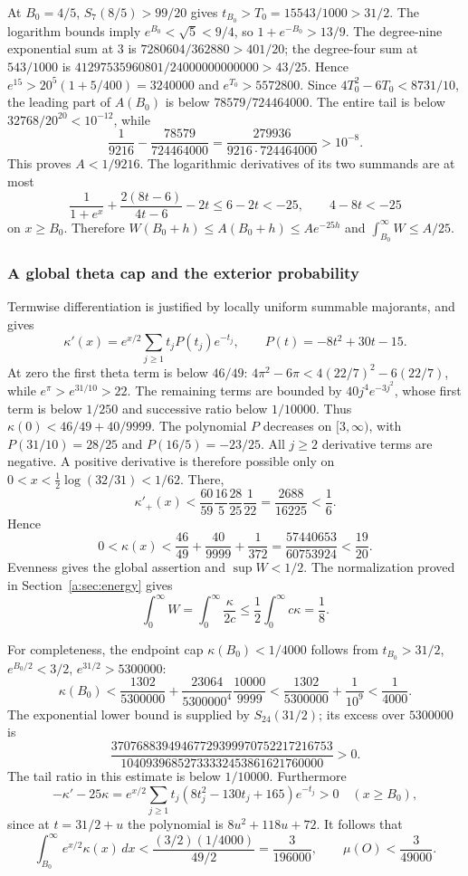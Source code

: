 \documentclass[11pt,a4paper]{article}
\numberwithin{equation}{section}
\theoremstyle{definition}\newtheorem{definition}[theorem]{Definition}
\theoremstyle{remark}\newtheorem{remark}[theorem]{Remark}
\begin{document}
At ${B_0}=4/5$, $S_7(8/5)>99/20$ gives
$t_{B_0}>T_0=15543/1000>31/2$.
The logarithm bounds imply $e^{B_0}<\sqrt5<9/4$, so $1+e^{-{B_0}}>13/9$.
The degree-nine exponential sum at $3$ is
$7280604/362880>401/20$; the degree-four sum at $543/1000$ is
$41297535960801/24000000000000>43/25$.
Hence $e^{15}>20^5(1+5/400)=3240000$ and $e^{T_0}>5572800$.
Since $4T_0^2-6T_0<8731/10$, the leading part of $A({B_0})$ is below
$78579/724464000$.
The entire tail is below $32768/20^{20}<10^{-12}$, while
\[
 \frac1{9216}-\frac{78579}{724464000}
 =\frac{279936}{9216\cdot724464000}>10^{-8}.
\]
This proves $A<1/9216$.
The logarithmic derivatives of its two summands are at most
\[
 \frac1{1+e^x}+\frac{2(8t-6)}{4t-6}-2t\le6-2t<-25,
 \qquad 4-8t<-25
\]
on $x\ge {B_0}$.
Therefore $W({B_0}+h)\le A({B_0}+h)\le Ae^{-25h}$ and
$\int_{B_0}^\infty W\le A/25$.

\subsubsection{A global theta cap and the exterior probability}
Termwise differentiation is justified by locally uniform summable majorants, and gives
\[
 \kappa'(x)=e^{x/2}\sum_{j\ge1}t_jP(t_j)e^{-t_j},
 \qquad P(t)=-8t^2+30t-15.
\]
At zero the first theta term is below $46/49$:
$4\pi^2-6\pi<4(22/7)^2-6(22/7)$, while
$e^\pi>e^{31/10}>22$.
The remaining terms are bounded by $40j^4e^{-3j^2}$,
whose first term is below $1/250$ and successive ratio below $1/10000$.
Thus $\kappa(0)<46/49+40/9999$.
The polynomial $P$ decreases on $[3,\infty)$, with
$P(31/10)=28/25$ and $P(16/5)=-23/25$.
All $j\ge2$ derivative terms are negative.
A positive derivative is therefore possible only on
$0<x<\frac12\log(32/31)<1/62$.
There,
\[
 \kappa'_+(x)<\frac{60}{59}\frac{16}{5}\frac{28}{25}\frac1{22}
 =\frac{2688}{16225}<\frac16.
\]
Hence
\[
 0<\kappa(x)<\frac{46}{49}+\frac{40}{9999}+\frac1{372}
 =\frac{57440653}{60753924}<\frac{19}{20}.
\]
Evenness gives the global assertion and $\sup W<1/2$.
The normalization proved in Section~\ref{a:sec:energy} gives
\[
 \int_0^\infty W
 =\int_0^\infty\frac{\kappa}{2c}\le\frac12\int_0^\infty c\kappa=\frac18.
\]

For completeness, the endpoint cap $\kappa({B_0})<1/4000$ follows from
$t_{B_0}>31/2$, $e^{{B_0}/2}<3/2$, $e^{31/2}>5300000$:
\[
 \kappa({B_0})<\frac{1302}{5300000}
 +\frac{23064}{5300000^4}\frac{10000}{9999}
 <\frac{1302}{5300000}+\frac1{10^9}<\frac1{4000}.
\]
The exponential lower bound is supplied by $S_{24}(31/2)$;
its excess over $5300000$ is
\[
 \frac{37076883949467729399970752217216753}
 {10409396852733332453861621760000}>0.
\]
The tail ratio in this estimate is below $1/10000$.
Furthermore
\[
 -\kappa'-25\kappa
 =e^{x/2}\sum_{j\ge1}t_j(8t_j^2-130t_j+165)e^{-t_j}>0
 \quad(x\ge {B_0}),
\]
since at $t=31/2+u$ the polynomial is $8u^2+118u+72$.
It follows that
\[
 \int_{B_0}^\infty e^{x/2}\kappa(x)\,dx
 <\frac{(3/2)(1/4000)}{49/2}=\frac3{196000},
 \qquad \mu(O)<\frac3{49000}.
\]
\end{document}
